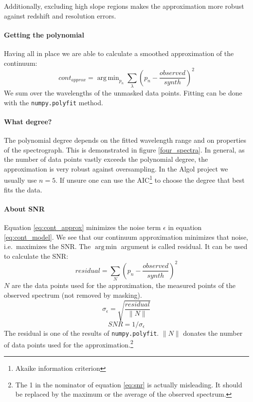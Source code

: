 \documentclass[10pt,a4paper,notitlepage,twocolumn]{article}
\DeclareMathOperator*{\argmin}{arg\,min}
\begin{document}
Additionally, excluding high slope regions makes the approximation more robust against redshift and resolution errors. 


\paragraph{Getting the polynomial}
Having all in place we are able to calculate a smoothed approximation of the continuum:
\begin{equation}
	\label{eq:cont_approx}
	cont_{approx} = \argmin_{p_n} \sum_{\lambda} \left( p_n - \frac{observed}{synth} \right)^2
\end{equation}
We sum over the wavelengths of the unmasked data points.
Fitting can be done with the \verb|numpy.polyfit| method.

\paragraph{What degree?}
The polynomial degree depends on the fitted wavelength range and on properties of the spectrograph.
This is demonstrated in figure \ref{four_spectra}.
In general, as the number of data points vastly exceeds the polynomial degree, the approximation is very robust against oversampling.
In the Algol project we usually use $n=5$.
If unsure one can use the AIC\footnote{Akaike information criterion} \cite{Akaike1974} to choose the degree that best fits the data.

\paragraph{About SNR}
Equation \ref{eq:cont_approx} minimizes the noise term $\epsilon$ in equation \ref{eq:cont_model}.
We see that our continuum approximation minimizes that noise, i.e.\ maximizes the SNR.
The $\argmin$ argument is called residual. It can be used to calculate the SNR:
\begin{equation}
	residual = \sum_N \left( p_n - \frac{observed}{synth} \right)^2
\end{equation}
$N$ are the data points used for the approximation, the measured points of the observed spectrum (not removed by masking).
\begin{equation}
	\sigma_\epsilon = \sqrt{ \frac{residual}{\|N\|}}
\end{equation}
\begin{equation}
	\label{eq:snr}
	SNR = 1 / \sigma_\epsilon
\end{equation}
The residual is one of the results of \verb|numpy.polyfit|.
$\|N\|$ donates the number of data points used for the approximation.\footnote{The 1 in the nominator of equation \ref{eq:snr} is actually misleading. It should be replaced by the maximum or the average of the observed spectrum.}
\end{document}
